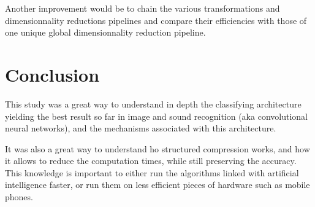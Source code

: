 \documentclass[11pt,a4paper]{article}
\begin{document}
	Another improvement would be to chain the various transformations and dimensionnality reductions pipelines and compare their efficiencies with those of one unique global dimensionnality reduction pipeline.
	
	
	\section{Conclusion}
	This study was a great way to understand in depth the classifying architecture yielding the best result so far in image and sound recognition (aka convolutional neural networks), and the mechanisms associated with this architecture.
	
	
	It was also a great way to understand ho structured compression works, and how it allows to reduce the computation times, while still preserving the accuracy. This knowledge is important to either run the algorithms linked with artificial intelligence faster, or run them on less efficient pieces of hardware such as mobile phones.


	
\end{document}
